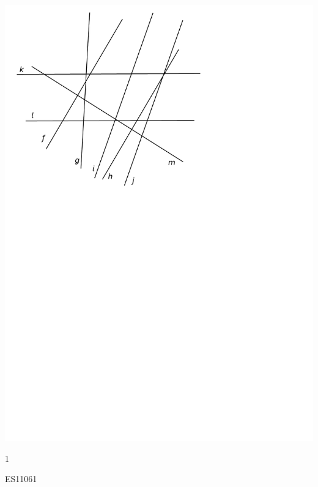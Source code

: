 \documentclass[a4paper,11pt]{report}
\begin{document}
\begin{exop}
{\begin{minipage}[t]{0.55\textwidth}{
	   \vspace{0pt}
\begin{center}
	\includegraphics[scale=0.7]{media/es-11/13-6}
\end{center}
	   }
	   \end{minipage}
    }
    {1}
\end{exop}

\begin{exof}{ES1}{106}{1}
\end{exof}
\end{document}
